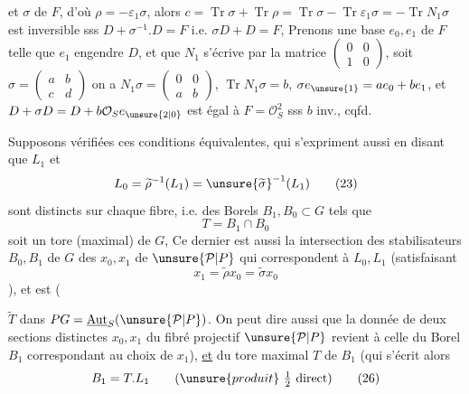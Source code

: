 et    $\sigma$ de $F$, d'où
$\rho=-\varepsilon_1\sigma$, alors 
$c=\operatorname{Tr}\sigma+\operatorname{Tr}\rho=\operatorname{Tr}\sigma-\operatorname{Tr}\varepsilon_1\sigma
=-\operatorname{Tr}N_1\sigma$ est inversible sss $D+\sigma^{-1}.D=F$
i.e. $\sigma D+D=F$,  Prenons une base
$e_0,e_1$ de $F$ telle que $e_1$ engendre $D$, et que $N_1$ s'écrive par la matrice
$\begin{pmatrix}0&0\\1&0\end{pmatrix}$,
soit $\sigma=\begin{pmatrix}a&b\\c&d\end{pmatrix}$ on a
$N_1\sigma=\begin{pmatrix}0&0\\a&b\end{pmatrix}$,
$\operatorname{Tr}N_1\sigma=b$,
$\sigma e_{\unsure{1}}=a e_0+b e_1$, et
$D+\sigma D=D+b\mathcal O_S e_{\unsure{2|0}}$
est égal à $F=\mathcal O_S^2$ sss $b$ inv., cqfd.

Supposons vérifiées ces conditions équivalentes,  qui s'expriment aussi en disant que $L_1$ et
\[
L_0=\widetilde\rho^{-1}(L_1)=\unsure{\widetilde\sigma}^{-1}(L_1)
\tag{23}
\]
sont distincts sur chaque fibre, i.e.  des Borels $B_1,B_0\subset G$ tels que
\[
T=B_1\cap B_0
\tag{24}
\]
soit un tore (maximal) de $G$, 
Ce dernier est aussi la  intersection des stabilisateurs $B_0,B_1$ de $G$ des 
$x_0,x_1$ de $\unsure{\mathcal P|P}$ qui correspondent à $L_0,L_1$
(satisfaisant
\[
x_1=\widetilde\rho x_0=\widetilde\sigma x_0
\tag{25}
\]
), et est    ( 



 $\widetilde T$ dans $PG=\underline{\operatorname{Aut}}_S(\unsure{\mathcal P|P})$.
On peut dire aussi que la donnée de deux sections  distinctes
$x_0,x_1$ du fibré projectif $\unsure{\mathcal P|P}$  revient à celle du Borel
$B_1$ correspondant au choix de $x_1$), \uline{et} du tore maximal $T$ de $B_1$
(qui s'écrit alors
\[
B_1=T.L_1 \qquad (\unsure{produit}\ \tfrac12\ \text{direct})
\tag{26}
\]

